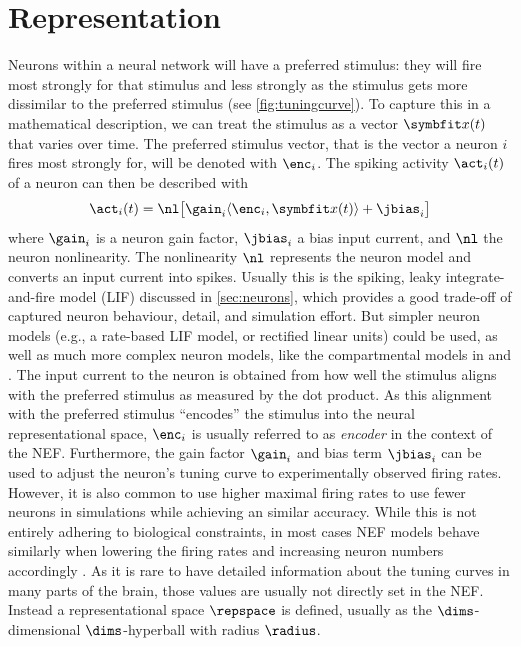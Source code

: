 \section{Representation}
Neurons within a neural network will have a preferred stimulus: they will fire most strongly for that stimulus and less strongly as the stimulus gets more dissimilar to the preferred stimulus (see \cref{fig:tuningcurve}).
To capture this in a mathematical description, we can treat the stimulus as a vector $\vc x(t)$ that varies over time.
The preferred stimulus vector, that is the vector a neuron $i$ fires most strongly for, will be denoted with $\enc_i$.
The spiking activity $\act_i(t)$ of a neuron can then be described with
\begin{equation}
    \act_i(t) = \nl\!\sbr{\gain_i \langle\enc_i, \vc x(t)\rangle + \jbias_i}
\end{equation}
where $\gain_i$ is a neuron gain factor, $\jbias_i$ a bias input current, and $\nl$ the neuron nonlinearity.
The nonlinearity $\nl$ represents the neuron model and converts an input current into spikes.
Usually this is the spiking, leaky integrate-and-fire model (LIF) discussed in \cref{sec:neurons}, which provides a good trade-off of captured neuron behaviour, detail, and simulation effort.
But simpler neuron models (e.g., a rate-based LIF model, or rectified linear units) could be used, as well as much more complex neuron models, like the compartmental models in \textcite{eliasmith2016} and \textcite{duggins2017c}.
The input current to the neuron is obtained from how well the stimulus aligns with the preferred stimulus as measured by the dot product.
As this alignment with the preferred stimulus ``encodes'' the stimulus into the neural representational space, $\enc_i$ is usually referred to as \emph{encoder} in the context of the NEF\@.
Furthermore, the gain factor $\gain_i$ and bias term $\jbias_i$ can be used to adjust the neuron's tuning curve to experimentally observed firing rates.
However, it is also common to use higher maximal firing rates to use fewer neurons in simulations while achieving an similar accuracy.
While this is not entirely adhering to biological constraints, in most cases NEF models behave similarly when lowering the firing rates and increasing neuron numbers accordingly \parencite[e.g.,][]{gosmann2015}.
As it is rare to have detailed information about the tuning curves in many parts of the brain, those values are usually not directly set in the NEF\@.
Instead a representational space $\repspace$ is defined, usually as the $\dims$-dimensional $\dims$-hyperball with radius $\radius$.
